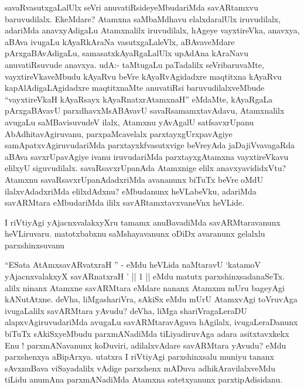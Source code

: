 \begin{artha}
savaRvasutxgaLalUlx seVri anuvatiRsideyeMbudariMda savARtamxvu baruvudilalx. EkeMdare? Atamxna saMbaMdhavu elalxdaralUlx iruvudilalx, adariMda anavxyAdigaLu Atamxnalilx iruvudilalx, hAgeye vayxtireVka, anavxya, aBAva ivugaLu kAyaRkAraNa vasutxgaLaleVlx, aBAvaveMdare pArxgaBAvAdigaLu, samasatxkAyaRgaLalUlx upAdAna kAraNavu anuvatiRsuvude anavxya. udA:- taMtugaLu paTadalilx seVribaruvaMte, vayxtireVkaveMbudu kAyaRvu beVre kAyaRvAgidadxre maqtitxna kAyaRvu kapAlAdigaLAgidadxre maqtitxnaMte anuvatiRsi baruvudilalxveMbude ``vayxtireVkaH kAyaRsayx kAyaRnatxrAtamxnaH'' eMdaMte, kAyaRgaLa pArxgaBAvavU parxdhavxMsABAvavU savaRsamamxtavAdavu, Atamxnalilx avugaLu saMBavisuvudeV ilalx, Atamxnu yAvAgalU satfsavxrUpanu AbAdhitavAgiruvanu, parxpaMcavelalx parxtayxgUrxpavAgiye samApatxvAgiruvudariMda parxtayxkfvasutxvige beVreyAda jaDajiVvavagaRda aBAva savxrUpavAgiye ivanu iruvudariMda parxtayxgAtamxna vayxtireVkavu elilxyU siguvudilalx. savaRsavxrUpanAda Atamxnige elilx anavxyavididxVtu? Atamxnu savaRsavxrUpanAdadxriMda avananunx biTuTx beVre oMdU ilalxvAdadxriMda elilxdAdxnu? eMbudanunx heVLabeVku, adariMda savARMtara eMbudariMda ililx savARtamxtavxvaneVnx heVLide.
\end{artha}

\begin{artha}
I riVtiyAgi yAjacnxvalakxyXru tamamx anuBavadiMda savARMtaravanunx heVLiruvaru. matotxbabxnu saMshayavanunx oDiDx avaranunx gelalxlu parxshinxsuvanu \mdash 
\end{artha}


\begin{artha}
``ESata AtAmxsavARvatxraH '' - eMdu heVLida naMtaravU `katamoV yAjacnxvalakxyX savARnatxraH ' || 1 || eMdu matutx parxshinxsadanaSeTx. alilx ninanx Atamxne savARMtara eMdare nananx Atamxnu mUru bageyAgi kANutAtxne. deVha, liMgashariVra, sAkiSx eMdu mUrU AtamxvAgi toVruvAga ivugaLalilx savARMtara yAvudu? deVha, liMga shariVragaLeraDU alapxvAgiruvudariMda avugaLu savARMtaravAguva hAgilalx, ivugaLeraDanunx biTuTx sAkiSxyeMbudu parxmANadiMda tiLiyadiruvAga adara asitxtavxkekx Enu ! parxmANavanunx koDuviri, adilalxvAdare savARMtara yAvudu? eMdu parxshenxya aBipArxya. \mdash  utatxra \mdash  I riVtiyAgi parxshinxsalu muniyu tananx sAvxnuBava viSayadalilx vAdige parxshenx mADuva adhikAravilalxveMdu tiLidu anumAna parxmANadiMda Atamxna satetxyanunx parxtipAdisidanu. 
\end{artha}

